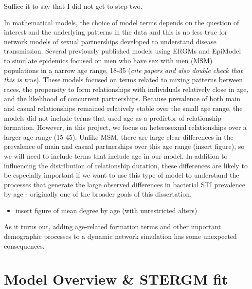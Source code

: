 \documentclass [11pt, proquest] {uwthesis}[2015/03/03]
\providecommand{\tightlist}{%
  \setlength{\itemsep}{0pt}\setlength{\parskip}{0pt}}
\begin{document}
Suffice it to say that I did not get to step two.

In mathematical models, the choice of model terms depends on the
question of interest and the underlying patterns in the data and this is
no less true for network models of sexual partnerships developed to
understand disease transmission. Several previously published models
using ERGMs and EpiModel to simulate epidemics focused on men who have
sex with men (MSM) populations in a narrow age range, 18-35 (\emph{cite
papers and also double check that this is true}). These models focused
on terms related to mixing patterns between races, the propensity to
form relationships with individuals relatively close in age, and the
likelihood of concurrent partnerships. Because prevalence of both main
and casual relationships remained relatively stable over the small age
range, the models did not include terms that used age as a predictor of
relationship formation. However, in this project, we focus on
heterosexual relationships over a larger age range (15-45). Unlike MSM,
there are large clear differences in the prevalence of main and casual
partnerships over this age range (insert figure), so we will need to
include terms that include age in our model. In addition to influencing
the distribution of relationship duration, these differences are likely
to be especially important if we want to use this type of model to
understand the processes that generate the large observed differences in
bacterial STI prevalence by age - originally one of the broader goals of
this dissertation.
\begin{itemize}
\tightlist
\item
  insert figure of mean degree by age (with unrestricted alters)
\end{itemize}
As it turns out, adding age-related formation terms and other important
demographic processes to a dynamic network simulation has some
unexpected consequences.

\section{Model Overview \& STERGM fit}\label{model-overview-stergm-fit}
\end{document}
